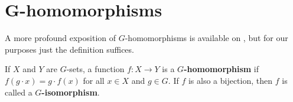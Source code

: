 \section{G-homomorphisms}

A more profound exposition of $G$-homomorphisms is available on \cite[p.~260]{RotmanITG}, but for our purposes just the definition suffices.

\begin{definition}
    If $X$ and $Y$ are $G$-sets, a function $f: X \rightarrow Y$ is a \textbf{$G$-homomorphism} if $f(g \cdot x) = g \cdot f(x)$ for all $x \in X$ and $g \in G$. If $f$ is also a bijection, then $f$ is called a \textbf{$G$-isomorphism}.

\end{definition}